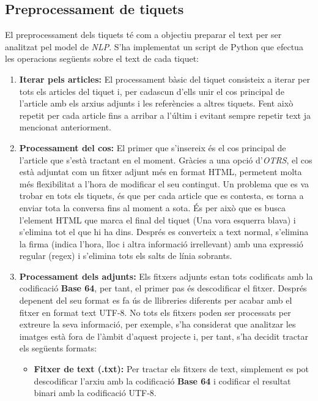 \subsection{Preprocessament de tiquets}
El preprocessament dels tiquets té com a objectiu preparar el text per ser analitzat pel model de \textit{NLP}. S'ha implementat un script de Python que efectua les operacions següents sobre el text de cada tiquet:
\begin{enumerate}
     \item \textbf{Iterar pels articles:} El processament bàsic del tiquet consisteix a iterar per tots els articles del tiquet i, per cadascun d'ells unir el cos principal de l'article amb els arxius adjunts i les referències a altres tiquets. Fent això repetit per cada article fins a arribar a l'últim i evitant sempre repetir text ja mencionat anteriorment.
     \item \textbf{Processament del cos:} El primer que s'insereix és el cos principal de l'article que s'està tractant en el moment. Gràcies a una opció d'\textit{OTRS}, el cos està adjuntat com un fitxer adjunt més en format HTML, permetent molta més flexibilitat a l'hora de modificar el seu contingut. Un problema que es va trobar en tots els tiquets, és que per cada article que es contesta, es torna a enviar tota la conversa fins al moment a sota. És per això que es busca l'element HTML que marca el final del tiquet (Una vora esquerra blava) i s'elimina tot el que hi ha dins. Després es converteix a text normal, s'elimina la firma (indica l'hora, lloc i altra informació irrellevant) amb una expressió regular (regex) i s'elimina tots els salts de línia sobrants.
     \item \textbf{Processament dels adjunts:} Els fitxers adjunts estan tots codificats amb la codificació \textbf{Base 64}, per tant, el primer pas és descodificar el fitxer. Després depenent del seu format es fa ús de llibreries diferents per acabar amb el fitxer en format text UTF-8. No tots els fitxers poden ser processats per extreure la seva informació, per exemple, s'ha considerat que analitzar les imatges està fora de l'àmbit d'aquest projecte i, per tant, s'ha decidit tractar els següents formats:
          \begin{itemize}
               \item \textbf{Fitxer de text (.txt):} Per tractar els fitxers de text, simplement es pot descodificar l'arxiu amb la codificació \textbf{Base 64} i codificar el resultat binari amb la codificació UTF-8.

\end{itemize}
\end{enumerate}
